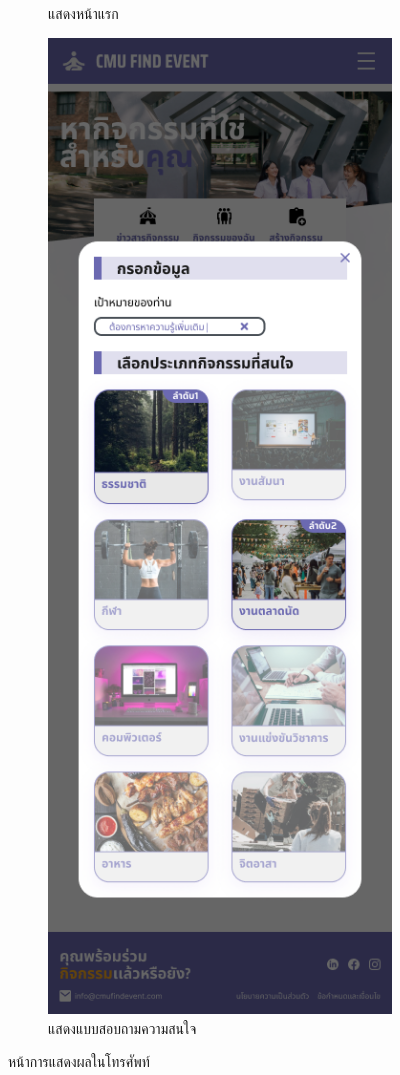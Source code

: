 \begin{figure}[h]
\begin{subfigure}[b]{0.3\linewidth}
    \caption{แสดงหน้าแรก}
  \end{subfigure}
  \hfill
  \begin{subfigure}[b]{0.3\linewidth}
    \includegraphics[width=\linewidth]{image/Figma-design/mobile-recomendation.png}
    \caption{แสดงแบบสอบถามความสนใจ}
  \end{subfigure}
  \caption{หน้าการแสดงผลในโทรศัพท์}
  \label{fig:mobile}
\end{figure}

